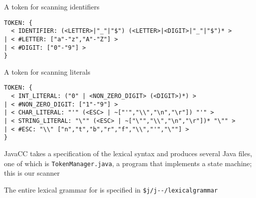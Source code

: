 \documentclass[8pt,a4paper,compress]{beamer}
\begin{document}
\begin{frame}[fragile]
\pause

A token for scanning identifiers

\begin{lstlisting}
TOKEN: {
  < IDENTIFIER: (<LETTER>|"_"|"$") (<LETTER>|<DIGIT>|"_"|"$")* >
| < #LETTER: ["a"-"z","A"-"Z"] >
| < #DIGIT: ["0"-"9"] >
}
\end{lstlisting}

\pause
\bigskip

A token for scanning literals

\begin{lstlisting}
TOKEN: {
  < INT_LITERAL: ("0" | <NON_ZERO_DIGIT> (<DIGIT>)*) >
| < #NON_ZERO_DIGIT: ["1"-"9"] >
| < CHAR_LITERAL: "'" (<ESC> | ~["'","\\","\n","\r"]) "'" >
| < STRING_LITERAL: "\"" (<ESC> | ~["\"","\\","\n","\r"])* "\"" >
| < #ESC: "\\" ["n","t","b","r","f","\\","'","\""] >
}
\end{lstlisting}

\pause
\bigskip

JavaCC takes a specification of the lexical syntax and produces several Java files, one of which is  \lstinline{TokenManager.java}, a program that implements a state machine; this is our scanner

\pause
\bigskip

The entire lexical grammar for \jmm is specified in \lstinline{$j/j--/lexicalgrammar}
\end{frame}
\end{document}
